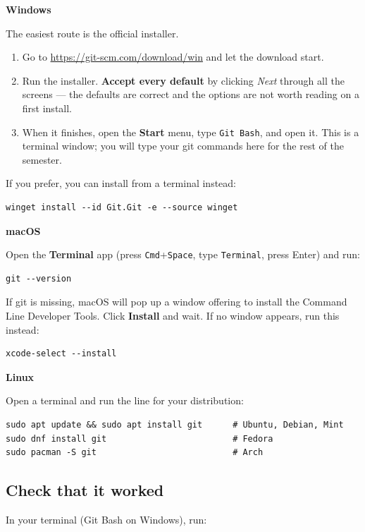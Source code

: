 \documentclass[11pt]{article}
\newcommand{\plat}[1]{\smallskip\noindent
  \textcolor{BrickRed}{\sffamily\bfseries #1}\par\nopagebreak\smallskip}
\begin{document}
\plat{Windows}
The easiest route is the official installer.

\begin{enumerate}[leftmargin=2.0em,itemsep=3pt]
  \item Go to \url{https://git-scm.com/download/win} and let the download start.
  \item Run the installer. \textbf{Accept every default} by clicking
        \emph{Next} through all the screens --- the defaults are correct and the
        options are not worth reading on a first install.
  \item When it finishes, open the \textbf{Start} menu, type
        \texttt{Git Bash}, and open it. This is a terminal window; you will type
        your git commands here for the rest of the semester.
\end{enumerate}

\noindent If you prefer, you can install from a terminal instead:

\begin{lstlisting}
winget install --id Git.Git -e --source winget
\end{lstlisting}

\plat{macOS}
Open the \textbf{Terminal} app (press \texttt{Cmd}+\texttt{Space}, type
\texttt{Terminal}, press Enter) and run:

\begin{lstlisting}
git --version
\end{lstlisting}

\noindent If git is missing, macOS will pop up a window offering to install the
Command Line Developer Tools. Click \textbf{Install} and wait. If no window
appears, run this instead:

\begin{lstlisting}
xcode-select --install
\end{lstlisting}

\plat{Linux}
Open a terminal and run the line for your distribution:

\begin{lstlisting}
sudo apt update && sudo apt install git      # Ubuntu, Debian, Mint
sudo dnf install git                         # Fedora
sudo pacman -S git                           # Arch
\end{lstlisting}

\subsection*{Check that it worked}
In your terminal (Git Bash on Windows), run:
\end{document}
